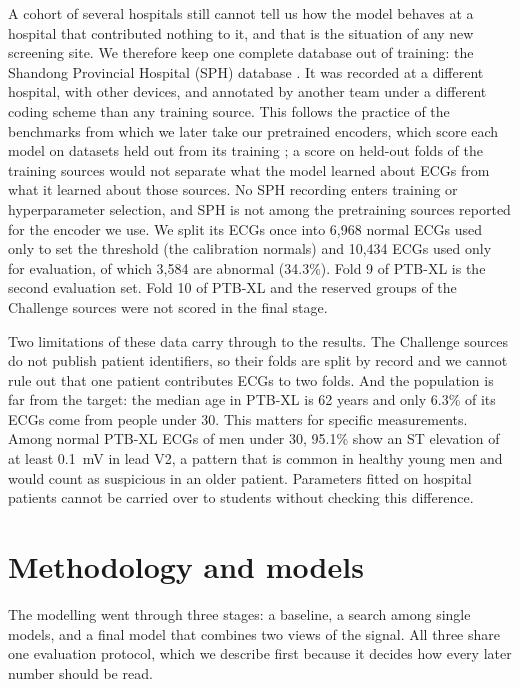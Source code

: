 \documentclass[letterpaper,11pt]{article}
\begin{document}
A cohort of several hospitals still cannot tell us how the model behaves at a hospital that contributed nothing to it, and that is the situation of any new screening site. We therefore keep one complete database out of training: the Shandong Provincial Hospital (SPH) database \parencite{liu2022large}. It was recorded at a different hospital, with other devices, and annotated by another team under a different coding scheme than any training source. This follows the practice of the benchmarks from which we later take our pretrained encoders, which score each model on datasets held out from its training \parencite{almasud2025benchmarking,lunelli2026benchecg}; a score on held-out folds of the training sources would not separate what the model learned about ECGs from what it learned about those sources. No SPH recording enters training or hyperparameter selection, and SPH is not among the pretraining sources reported for the encoder we use. We split its ECGs once into 6,968 normal ECGs used only to set the threshold (the calibration normals) and 10,434 ECGs used only for evaluation, of which 3,584 are abnormal (34.3\%). Fold 9 of PTB-XL is the second evaluation set. Fold 10 of PTB-XL and the reserved groups of the Challenge sources were not scored in the final stage.

Two limitations of these data carry through to the results. The Challenge sources do not publish patient identifiers, so their folds are split by record and we cannot rule out that one patient contributes ECGs to two folds. And the population is far from the target: the median age in PTB-XL is 62 years and only 6.3\% of its ECGs come from people under 30. This matters for specific measurements. Among normal PTB-XL ECGs of men under 30, 95.1\% show an ST elevation of at least 0.1~mV in lead V2, a pattern that is common in healthy young men and would count as suspicious in an older patient. Parameters fitted on hospital patients cannot be carried over to students without checking this difference.

\section{Methodology and models}

The modelling went through three stages: a baseline, a search among single models, and a final model that combines two views of the signal. All three share one evaluation protocol, which we describe first because it decides how every later number should be read.
\end{document}

